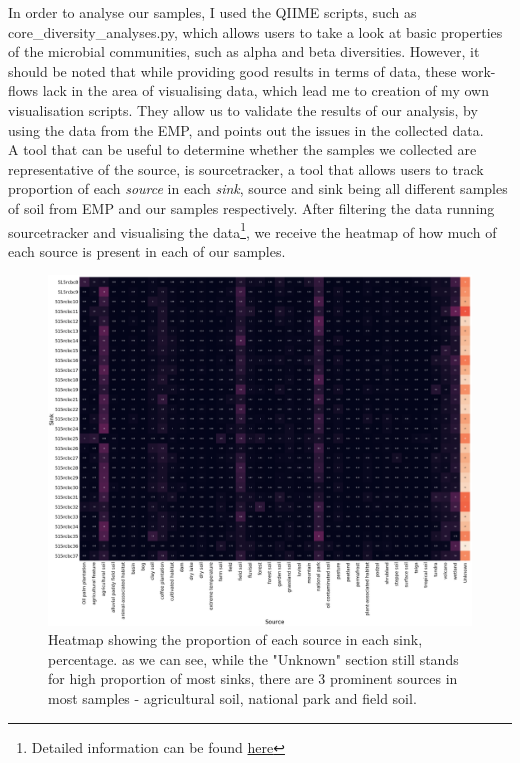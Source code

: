 \documentclass{article}
\begin{document}
\begin{multicols}{2}
In order to analyse our samples, I used the QIIME scripts, such as core\_diversity\_analyses.py, which allows users to take a look at basic properties of the microbial communities, such as alpha and beta diversities. However, it should be noted that while providing good results in terms of data, these work-flows lack in the area of visualising data, which lead me to creation of my own visualisation scripts\cite{Anonymous2018}. They allow us to validate the results of our analysis, by using the data from the EMP, and points out the issues in the collected data.\\
A tool that can be useful to determine whether the samples we collected are representative of the source, is sourcetracker\cite{Knights2011}, a tool that allows users to track proportion of each \textit{source} in each \textit{sink}, source and sink being all different samples of soil from EMP and our samples respectively. After filtering the data running sourcetracker and visualising the data\footnote{Detailed information can be found \href{https://github.com/nameisBaron-MichaelBaron/BIOC3301/tree/master/sourcetracker}{here}}, we receive the heatmap of how much of each source is present in each of our samples.
\begin{figure}[H]
	\includegraphics[width=1\linewidth]{../sourcetracker/heatmap_perc.png}
	\caption{Heatmap showing the proportion of each source in each sink, percentage. as we can see, while the "Unknown" section still stands for high proportion of most sinks, there are 3 prominent sources in most samples - agricultural soil, national park and field soil. }

\end{figure}
\end{multicols}
\end{document}
